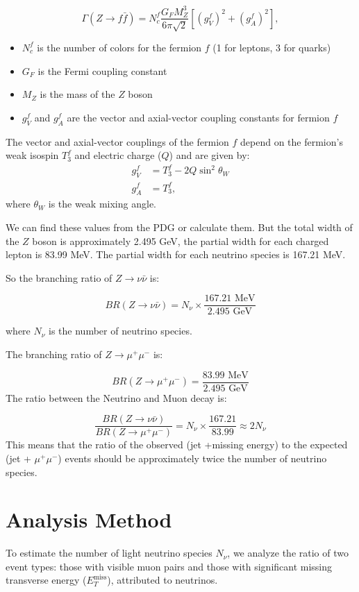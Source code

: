 \[
\Gamma (Z \to f \bar{f}) = N_c^f\frac{G_F M_Z^3}{6 \pi \sqrt{2}} \left[ \left(g_V^f\right)^2 + \left( g_A^f \right)^2 \right],
\]
\begin{itemize}[label=\(\ \star \)]
    \item $N_c^f$ is the number of colors for the fermion $f$ (1 for leptons, 3 for quarks)
    \item $G_F$ is the Fermi coupling constant
    \item $M_Z$ is the mass of the $Z$ boson
    \item $g_V^f$ and $g_A^f$ are the vector and axial-vector coupling constants for fermion $f$
\end{itemize}

The vector and axial-vector couplings of the fermion $f$ depend on the fermion's weak isospin $T_3^f$ and electric charge ($Q$) and are given by:
\begin{align}
g_V^f &= T_3^f - 2 Q \sin^2 \theta_W \\
g_A^f &= T_3^f,
\end{align} where $\theta_W$ is the weak mixing angle.

We can find these values from the PDG or calculate them. But the total width of the $Z$ boson is approximately 2.495 GeV, the partial width for each charged lepton is 83.99 MeV. The partial width for each neutrino species is 167.21 MeV.

So the branching ratio of $Z \to \nu \bar{\nu}$ is:

\[
BR(Z \to \nu \bar{\nu}) = N_\nu \times \frac{ 167.21 \text{ MeV}}{2.495 \text{ GeV}}\]

where $N_\nu$ is the number of neutrino species.

The branching ratio of $Z \to \mu^+ \mu^-$ is:

\[
BR(Z \to \mu^+ \mu^-) = \frac{ 83.99 \text{ MeV}}{2.495 \text{ GeV}}
\]
The ratio between the Neutrino and Muon decay is:

\[
\frac{BR(Z \to \nu \bar{\nu})}{BR(Z \to \mu^+ \mu^-)} = N_\nu \times \frac{167.21}{83.99} \approx 2N_\nu
\]
This means that the ratio of the observed (jet +missing energy) to the expected (jet + $\mu^+ \mu^-$) events should be approximately twice the number of neutrino species.

\section{Analysis Method}
To estimate the number of light neutrino species \( N_\nu \), we analyze the ratio of two event types: those with visible muon pairs and those with significant missing transverse energy (\( E_T^{\text{miss}} \)), attributed to neutrinos.

